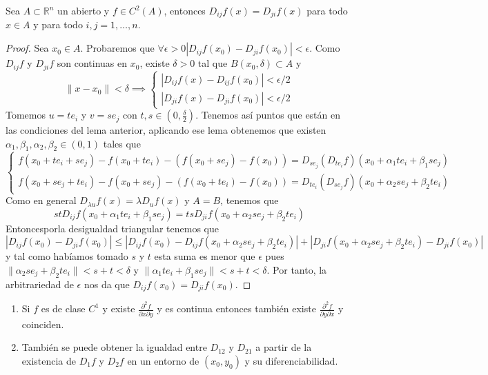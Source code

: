 \begin{teorema}
    Sea $A \subset \mathbb{R}^n$ un abierto y $f \in C^2(A)$, entonces $D_{ij}f(x) = D_{ji}f(x)$ para todo $x \in A$ y para todo $i, j = 1, \ldots, n$. 
\end{teorema}
\begin{proof}
    Sea $x_0 \in A$. Probaremos que $\forall \epsilon > 0 |D_{ij}f(x_0) - D_{ji}f(x_0)| < \epsilon$. Como $D_{ij}f$ y $D_{ji}f$ son continuas en $x_0$, existe $\delta > 0$ tal que $B(x_0, \delta) \subset A$ y 
    $$\|x -x_0\| < \delta \implies \begin{cases}
        |D_{ij}f(x) - D_{ij}f(x_0)| < \epsilon/2 \\
        |D_{ji}f(x) - D_{ji}f(x_0)| < \epsilon/2
    \end{cases}$$
    Tomemos $u = te_i$ y $v = se_j$ con $t, s \in (0, \frac{\delta}{2})$. Tenemos así puntos que están en las condiciones del lema anterior, aplicando ese lema obtenemos que existen $\alpha_1, \beta_1, \alpha_2, \beta_2 \in (0,1)$ tales que
    $$\begin{cases}
            f(x_0 + te_i + se_j) - f(x_0 + te_i) - (f(x_0 + se_j) - f(x_0)) = D_{se_j}(D_{te_i}f)(x_0 + \alpha_1 te_i + \beta_1 se_j)\\
            f(x_0 + se_j + te_i) - f(x_0 + se_j) - (f(x_0 + te_i) - f(x_0)) = D_{te_i}(D_{se_j}f)(x_0 + \alpha_2 se_j + \beta_2 te_i)
    \end{cases}$$
    Como en general $D_{\lambda u}f(x) = \lambda D_u f(x)$ y $A = B$, tenemos que 
    $$st D_{ij}f(x_0 + \alpha_1 te_i + \beta_1 se_j) = ts D_{ji}f(x_0 + \alpha_2 se_j + \beta_2 te_i)$$
    Entoncesporla desigualdad triangular tenemos que
    $$|D_{ij}f(x_0) - D_{ji}f(x_0)| \leq |D_{ij}f(x_0) - D_{ij}f(x_0 + \alpha_2 se_j + \beta_2 te_i)| + |D_{ji}f(x_0 + \alpha_2 se_j + \beta_2 te_i) - D_{ji}f(x_0)|$$
    y tal como habíamos tomado $s$ y $t$ esta suma es menor que $\epsilon$ pues $\|\alpha_2 s e_j +\beta_2 t e_i\| < s + t < \delta$ y $\|\alpha_1 t e_i + \beta_1 s e_j\| < s + t < \delta$. Por tanto, la arbitrariedad de $\epsilon$ nos da que $D_{ij}f(x_0) = D_{ji}f(x_0)$. 
\end{proof}
\begin{observación}
    \begin{enumerate}
        \item Si $f$ es de clase $C^1$ y existe $\frac{\partial^2 f}{\partial x \partial y}$ y es continua entonces también existe $\frac{\partial^2 f}{\partial y \partial x}$ y coinciden.
        \item También se puede obtener la igualdad entre $D_{12}$ y $D_{21}$ a partir de la existencia de $D_1f$ y $D_2f$ en un entorno de $(x_0, y_0)$ y su diferenciabilidad.
    \end{enumerate}
\end{observación}

